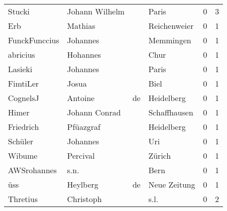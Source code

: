 \begin{center}
\begin{tiny}
\begin{longtabu}{llllrr}
                   Stucki &                     Johann Wilhelm &             &                                       Paris &          0 &         3 \\
                      Erb &                            Mathias &             &                                Reichenweier &          0 &         1 \\
            FunckFunccius &                           Johannes &             &                                   Memmingen &          0 &         1 \\
                 abricius &                           Hohannes &             &                                        Chur &          0 &         1 \\
                  Lasieki &                           Johannes &             &                                       Paris &          0 &         1 \\
                 FimtiLer &                              Josua &             &                                        Biel &          0 &         1 \\
                 CognelsJ &                            Antoine &          de &                                  Heidelberg &          0 &         1 \\
                    Himer &                      Johann Conrad &             &                                Schaffhausen &          0 &         1 \\
                Friedrich &                          Pfüazgraf &             &                                  Heidelberg &          0 &         1 \\
                  Schüler &                           Johannes &             &                                         Uri &          0 &         1 \\
                   Wibume &                           Percival &             &                                      Zürich &          0 &         1 \\
              AWSrohannes &                               s.n. &             &                                        Bern &          0 &         1 \\
                      üss &                           Heylberg &          de &                                Neue Zeitung &          0 &         1 \\
                 Thretius &                          Christoph &             &                                        s.l. &          0 &         2 \\

\end{longtabu}
\end{tiny}
\end{center}
